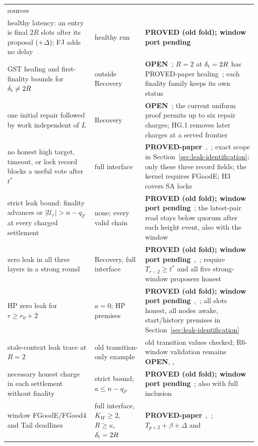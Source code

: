\documentclass{article}
\theoremstyle{plain}
\theoremstyle{definition}
\theoremstyle{remark}
\newcommand{\OPEN}{\textbf{OPEN}}
\begin{document}
\begin{center}
\begin{longtable}{>{\raggedright\arraybackslash}p{5.4cm}
  >{\raggedright\arraybackslash}p{1.9cm}
  >{\raggedright\arraybackslash}p{5.6cm}}
  sources~\cite[N3]{BPF}\\
healthy latency: an entry is final $2R$ slots after its proposal
  ($+\Delta$); FJ adds no delay & healthy run &
  \textbf{PROVED (old fold); window port pending}~\cite[T16, T17]{FL}\\
GST healing and first-finality bounds for $\delta_{\rm t}\neq2R$ &
  outside Recovery & \OPEN~\cite[\S9]{BPF}; $R=2$ at
  $\delta_{\rm t}=2R$ has PROVED-paper healing~\cite[H.21]{BPH}; each finality family keeps its own status\\
one initial repair followed by work independent of $L$ & Recovery &
  \OPEN~\cite[\S11, O.2]{BPH}; the current uniform proof permits up to
  six repair charges; HG.1 removes later charges at a served frontier\\
no honest high target, timeout, or lock record blocks a useful vote
  after $t^*$ & full interface &
  \textbf{PROVED-paper}~\cite[FF2]{BPF},~\cite[\S4]{SL175}; exact scope in
  Section~\ref{sec:leak-identification}; only these three record fields;
  the kernel requires FGoodE; H3 covers SA locks\\
strict leak bound: finality advances or $|\mathcal U_r|>n-q_F$
  at every charged settlement & none; every valid chain &
  \textbf{PROVED (old fold); window port pending}~\cite[\S4]{LS183}; the latest-pair read stays below quorum
  after each height event, also with the window\\
zero leak in all three layers in a strong round & Recovery,
  full interface &
  \textbf{PROVED (old fold); window port pending}~\cite[\S5]{LS183},~\cite[FF3--FF4]{BPF}; require
  $T_{r-2}\geq t^*$ and all five strong-window proposers honest\\
HP zero leak for $r\geq r_0+2$ & $a=0$; HP premises &
  \textbf{PROVED (old fold); window port pending}~\cite[HP]{BPF},~\cite[\S5]{LS183}; all slots honest,
  all nodes awake, start/history premises in
  Section~\ref{sec:leak-identification}\\
stale-context leak trace at $R=2$ & old transition-only example &
  old transition values checked; R6-window validation remains \OPEN,
  \cite[\S6, M2]{LS183},~\cite{RLR}\\
necessary honest charge in each settlement without finality &
  strict bound; $a\leq n-q_F$ &
  \textbf{PROVED (old fold); window port pending}~\cite[\S6, M4]{LS183}; also with full inclusion\\
window FGoodE/FGood4 and Tail deadlines & full interface,
  $K_W\geq2$, $R\geq\kappa$, $\delta_{\rm t}=2R$ &
  \textbf{PROVED-paper}~\cite[\S5]{FW},~\cite[F1--F9, FT-Tail-W]{BPF}; $T_{p+2}+\beta+\Delta$ and

\end{longtable}
\end{center}
\end{document}
